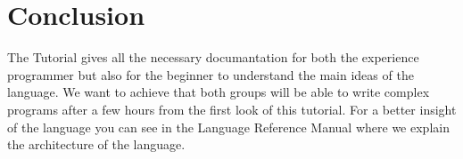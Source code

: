 \section{Conclusion}
\label{sect:conclusion}
The \lang{} Tutorial gives all the necessary documantation for both the experience programmer
but also for the beginner to understand the main ideas of the language. We want to achieve that
both groups will be able to write complex \lang{} programs after a few hours from the first 
look of this tutorial. For a better insight of the \lang{} language you can see in the Language
Reference Manual where we explain the architecture of the language.
